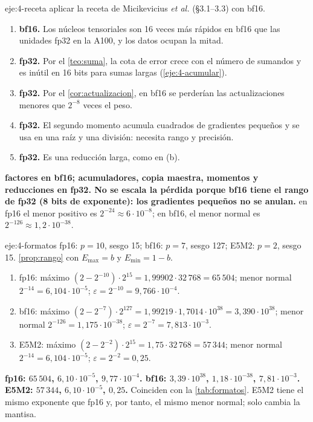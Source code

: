 \begin{solucion}{eje:4-receta}
\planteamiento aplicar la receta de Micikevicius \emph{et al.} (§3.1--3.3) con bf16.
\pasos
\begin{enumerate}[label=(\alph*)]
  \item \textbf{bf16.} Los núcleos tensoriales son 16 veces más rápidos en bf16 que las unidades fp32 en la A100, y los datos ocupan la mitad.
  \item \textbf{fp32.} Por el \cref{teo:suma}, la cota de error crece con el número de sumandos y es inútil en 16 bits para sumas largas (\cref{eje:4-acumular}).
  \item \textbf{fp32.} Por el \cref{cor:actualizacion}, en bf16 se perderían las actualizaciones menores que $2^{-8}$ veces el peso.
  \item \textbf{fp32.} El segundo momento acumula cuadrados de gradientes pequeños y se usa en una raíz y una división: necesita rango y precisión.
  \item \textbf{fp32.} Es una reducción larga, como en (b).
\end{enumerate}
\resultado \textbf{factores en bf16; acumuladores, copia maestra, momentos y reducciones en fp32. No se escala la pérdida porque bf16 tiene el rango de fp32 (8 bits de exponente): los gradientes pequeños no se anulan.}
\comprobacion en fp16 el menor positivo es $2^{-24}\approx 6\cdot 10^{-8}$; en bf16, el menor normal es $2^{-126}\approx 1{,}2\cdot 10^{-38}$.
\end{solucion}

\begin{solucion}{eje:4-formatos}
\datos fp16: $p=10$, sesgo 15; bf16: $p=7$, sesgo 127; E5M2: $p=2$, sesgo 15.
\planteamiento \cref{prop:rango} con $E_{\max}=b$ y $E_{\min}=1-b$.
\pasos
\begin{enumerate}[label=\arabic*.]
  \item fp16: máximo $(2-2^{-10})\cdot 2^{15}=1{,}99902\cdot 32\,768=65\,504$; menor normal $2^{-14}=6{,}104\cdot 10^{-5}$; $\varepsilon=2^{-10}=9{,}766\cdot 10^{-4}$.
  \item bf16: máximo $(2-2^{-7})\cdot 2^{127}=1{,}99219\cdot 1{,}7014\cdot 10^{38}=3{,}390\cdot 10^{38}$; menor normal $2^{-126}=1{,}175\cdot 10^{-38}$; $\varepsilon=2^{-7}=7{,}813\cdot 10^{-3}$.
  \item E5M2: máximo $(2-2^{-2})\cdot 2^{15}=1{,}75\cdot 32\,768=57\,344$; menor normal $2^{-14}=6{,}104\cdot 10^{-5}$; $\varepsilon=2^{-2}=0{,}25$.
\end{enumerate}
\resultado \textbf{fp16: $65\,504$, $6{,}10\cdot 10^{-5}$, $9{,}77\cdot 10^{-4}$. bf16: $3{,}39\cdot 10^{38}$, $1{,}18\cdot 10^{-38}$, $7{,}81\cdot 10^{-3}$. E5M2: $57\,344$, $6{,}10\cdot 10^{-5}$, $0{,}25$.} Coinciden con la \cref{tab:formatos}.
\comprobacion E5M2 tiene el mismo exponente que fp16 y, por tanto, el mismo menor normal; solo cambia la mantisa.
\end{solucion}

